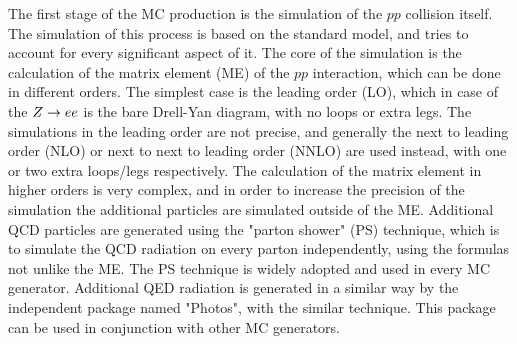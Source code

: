 The first stage of the MC production is the simulation of the $pp$ collision itself. The simulation of this process is based on the standard model, and tries to account for every significant aspect of it. The core of the simulation is the calculation of the matrix element (ME) of the $pp$ interaction, which can be done in different orders. The simplest case is the leading order (LO), which in case of the $Z \rightarrow ee$ is the bare Drell-Yan diagram, with no loops or extra legs. The simulations in the leading order are not precise, and generally the next to leading order (NLO) or next to next to leading order (NNLO) are used instead, with one or two extra loops/legs respectively. The calculation of the matrix element in higher orders is very complex, and in order to increase the precision of the simulation the additional particles are simulated outside of the ME. Additional QCD particles are generated using the "parton shower" (PS) technique, which is to simulate the QCD radiation on every parton independently, using the formulas not unlike the ME. The PS technique is widely adopted and used in every MC generator. Additional QED radiation is generated in a similar way by the independent package named "Photos", with the similar technique. This package can be used in conjunction with other MC generators.


